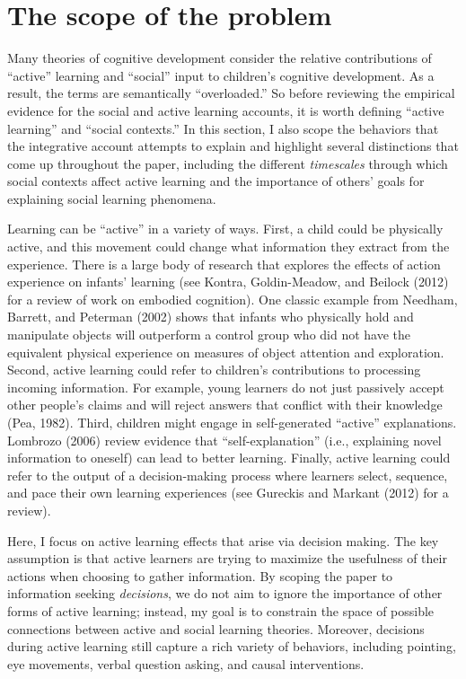 \documentclass[english,floatsintext,man]{apa6}
\theoremstyle{definition}
\theoremstyle{definition}
\theoremstyle{definition}
\theoremstyle{remark}
\begin{document}
\section{The scope of the problem}\label{the-scope-of-the-problem}

Many theories of cognitive development consider the relative
contributions of \enquote{active} learning and \enquote{social} input to
children's cognitive development. As a result, the terms are
semantically \enquote{overloaded.} So before reviewing the empirical
evidence for the social and active learning accounts, it is worth
defining \enquote{active learning} and \enquote{social contexts.} In
this section, I also scope the behaviors that the integrative account
attempts to explain and highlight several distinctions that come up
throughout the paper, including the different \emph{timescales} through
which social contexts affect active learning and the importance of
others' goals for explaining social learning phenomena.

Learning can be \enquote{active} in a variety of ways. First, a child
could be physically active, and this movement could change what
information they extract from the experience. There is a large body of
research that explores the effects of action experience on infants'
learning (see Kontra, Goldin-Meadow, and Beilock (2012) for a review of
work on embodied cognition). One classic example from Needham, Barrett,
and Peterman (2002) shows that infants who physically hold and
manipulate objects will outperform a control group who did not have the
equivalent physical experience on measures of object attention and
exploration. Second, active learning could refer to children's
contributions to processing incoming information. For example, young
learners do not just passively accept other people's claims and will
reject answers that conflict with their knowledge (Pea, 1982). Third,
children might engage in self-generated \enquote{active} explanations.
Lombrozo (2006) review evidence that \enquote{self-explanation} (i.e.,
explaining novel information to oneself) can lead to better learning.
Finally, active learning could refer to the output of a decision-making
process where learners select, sequence, and pace their own learning
experiences (see Gureckis and Markant (2012) for a review).

Here, I focus on active learning effects that arise via decision making.
The key assumption is that active learners are trying to maximize the
usefulness of their actions when choosing to gather information. By
scoping the paper to information seeking \emph{decisions}, we do not aim
to ignore the importance of other forms of active learning; instead, my
goal is to constrain the space of possible connections between active
and social learning theories. Moreover, decisions during active learning
still capture a rich variety of behaviors, including pointing, eye
movements, verbal question asking, and causal interventions.
\end{document}
